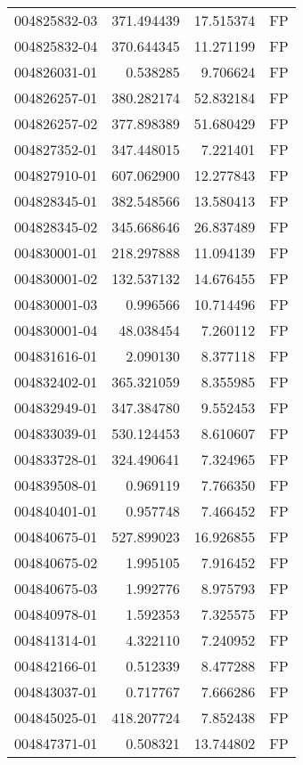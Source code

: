 \begin{tabular}{lrrl}
004825832-03 &  371.494439 &    17.515374 &   FP \\
004825832-04 &  370.644345 &    11.271199 &   FP \\
004826031-01 &    0.538285 &     9.706624 &   FP \\
004826257-01 &  380.282174 &    52.832184 &   FP \\
004826257-02 &  377.898389 &    51.680429 &   FP \\
004827352-01 &  347.448015 &     7.221401 &   FP \\
004827910-01 &  607.062900 &    12.277843 &   FP \\
004828345-01 &  382.548566 &    13.580413 &   FP \\
004828345-02 &  345.668646 &    26.837489 &   FP \\
004830001-01 &  218.297888 &    11.094139 &   FP \\
004830001-02 &  132.537132 &    14.676455 &   FP \\
004830001-03 &    0.996566 &    10.714496 &   FP \\
004830001-04 &   48.038454 &     7.260112 &   FP \\
004831616-01 &    2.090130 &     8.377118 &   FP \\
004832402-01 &  365.321059 &     8.355985 &   FP \\
004832949-01 &  347.384780 &     9.552453 &   FP \\
004833039-01 &  530.124453 &     8.610607 &   FP \\
004833728-01 &  324.490641 &     7.324965 &   FP \\
004839508-01 &    0.969119 &     7.766350 &   FP \\
004840401-01 &    0.957748 &     7.466452 &   FP \\
004840675-01 &  527.899023 &    16.926855 &   FP \\
004840675-02 &    1.995105 &     7.916452 &   FP \\
004840675-03 &    1.992776 &     8.975793 &   FP \\
004840978-01 &    1.592353 &     7.325575 &   FP \\
004841314-01 &    4.322110 &     7.240952 &   FP \\
004842166-01 &    0.512339 &     8.477288 &   FP \\
004843037-01 &    0.717767 &     7.666286 &   FP \\
004845025-01 &  418.207724 &     7.852438 &   FP \\
004847371-01 &    0.508321 &    13.744802 &   FP \\

\end{tabular}
